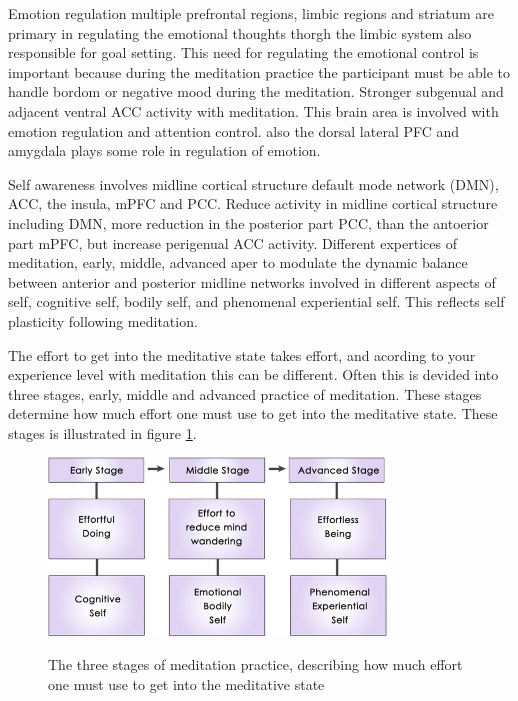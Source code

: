 Emotion regulation multiple prefrontal regions, limbic regions and striatum are primary in regulating the emotional thoughts thorgh the limbic system also responsible for goal setting. This need for regulating the emotional control is important because during the meditation practice the participant must be able to handle bordom or negative mood during the meditation. Stronger subgenual and adjacent ventral ACC activity with meditation. This brain area is involved with emotion regulation and attention control. also the dorsal lateral PFC and amygdala plays some role in regulation of emotion. 


Self awareness involves midline cortical structure default mode network (DMN), ACC, the insula, mPFC and PCC. Reduce activity in midline cortical structure including DMN, more reduction in the posterior part PCC, than the antoerior part mPFC, but increase perigenual ACC activity.
Different expertices of meditation, early, middle, advanced aper to modulate the dynamic balance between anterior and posterior midline networks involved in different aspects of self, cognitive self, bodily self, and phenomenal experiential self. This reflects self plasticity following meditation. 

The effort to get into the meditative state takes effort, and acording to your experience level with meditation this can be different. Often this is devided into three stages, early, middle and advanced practice of meditation. These stages determine how much effort one must use to get into the meditative state. These stages is illustrated in figure \ref{fig:meditation_stages}.

\begin{figure}[H]
	\includegraphics[width=0.8\textwidth]{figures/stages_of_meditation.png} 
	\caption{The three stages of meditation practice, describing how much effort one must use to get into the meditative state}
	\label{fig:meditation_stages}  
	\cite{Tang2017}
\end{figure}  



